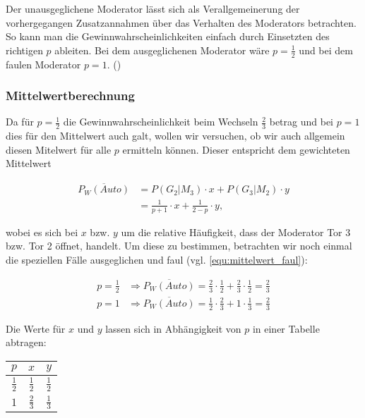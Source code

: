 Der unausgeglichene Moderator lässt sich als Verallgemeinerung der vorhergegangen Zusatzannahmen über das Verhalten des Moderators betrachten. So kann man die Gewinnwahrscheinlichkeiten einfach durch Einsetzten des richtigen $p$ ableiten.
Bei dem ausgeglichenen Moderator wäre $p = \frac{1}{2}$ und bei dem faulen Moderator $p = 1$.  (\cite{Rosenthal:2008})

\subsubsection{Mittelwertberechnung}

Da für $p = \frac{1}{2}$ die Gewinnwahrscheinlichkeit beim Wechseln $\frac{2}{3}$ betrag und bei $p = 1$ dies für den Mittelwert auch galt, wollen wir versuchen, ob wir auch allgemein diesen Mitelwert für alle $p$ ermitteln können. Dieser entspricht dem gewichteten Mittelwert

\label{equ:mittelwert}
\begin{equation}
    \begin{split}
        \overline{P_W(Auto)} & = P(G_2 | M_3) \cdot x + P(G_3 | M_2) \cdot y    \\
        & = \frac{1}{p+1} \cdot x + \frac{1}{2-p} \cdot y,
    \end{split}
\end{equation}

wobei es sich bei $x$ bzw. $y$ um die relative Häufigkeit, dass der Moderator Tor 3 bzw. Tor 2 öffnet, handelt. Um diese zu bestimmen, betrachten wir noch einmal die speziellen Fälle ausgeglichen und faul (vgl. \autoref{equ:mittelwert_faul}):

\begin{align*}
    p = \frac{1}{2} & \Rightarrow \overline{P_W(Auto)} = \frac{2}{3} \cdot \frac{1}{2} + \frac{2}{3} \cdot \frac{1}{2} = \frac{2}{3} \\
    p = 1           & \Rightarrow \overline{P_W(Auto)} = \frac{1}{2} \cdot \frac{2}{3} + 1\cdot \frac{1}{3} = \frac{2}{3}
\end{align*}

Die Werte für $x$ und $y$ lassen sich in Abhängigkeit von $p$ in einer Tabelle abtragen:

\begin{center}
    \begin{tabular}[h]{|c|c|c|}
        \hline
        \textbf{$p$}  & \textbf{$x$}  & \textbf{$y$}  \\
        \hline
        $\frac{1}{2}$ & $\frac{1}{2}$ & $\frac{1}{2}$ \\
        $1$           & $\frac{2}{3}$ & $\frac{1}{3}$ \\
        \hline
    \end{tabular}
\end{center}

